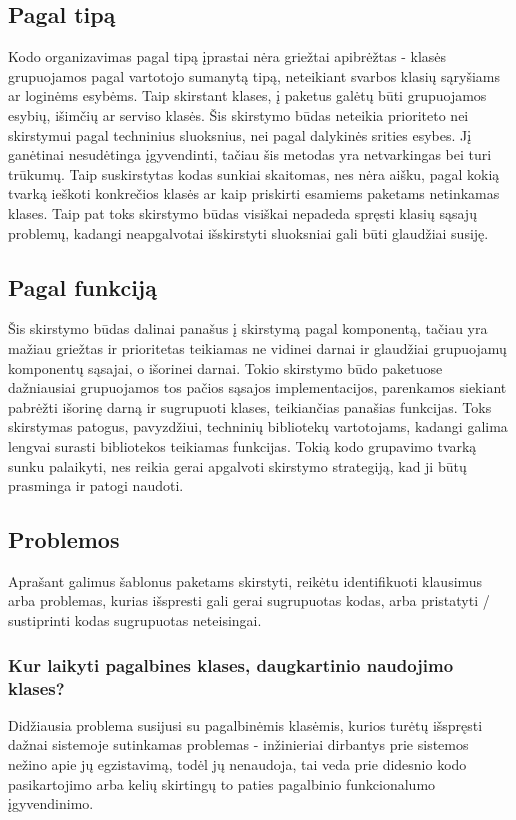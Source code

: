 \subsection{Pagal tipą}
Kodo organizavimas pagal tipą įprastai nėra griežtai apibrėžtas - klasės grupuojamos pagal vartotojo sumanytą tipą, neteikiant svarbos
klasių sąryšiams ar loginėms esybėms. Taip skirstant klases, į paketus galėtų būti grupuojamos esybių, išimčių ar serviso klasės. Šis skirstymo būdas
neteikia prioriteto nei skirstymui pagal techninius sluoksnius, nei pagal dalykinės srities esybes. Jį ganėtinai nesudėtinga įgyvendinti,
tačiau šis metodas yra netvarkingas bei turi trūkumų. Taip suskirstytas kodas sunkiai skaitomas, nes nėra aišku, pagal kokią tvarką
ieškoti konkrečios klasės ar kaip priskirti esamiems paketams netinkamas klases. Taip pat toks skirstymo būdas visiškai nepadeda spręsti
klasių sąsajų problemų, kadangi neapgalvotai išskirstyti sluoksniai gali būti glaudžiai susiję.

\subsection{Pagal funkciją}
Šis skirstymo būdas dalinai panašus į skirstymą pagal komponentą, tačiau yra mažiau griežtas ir
prioritetas teikiamas ne vidinei darnai ir glaudžiai grupuojamų
komponentų sąsajai, o išorinei darnai. Tokio skirstymo būdo paketuose dažniausiai grupuojamos tos pačios sąsajos implementacijos,
parenkamos siekiant pabrėžti išorinę darną ir sugrupuoti klases, teikiančias panašias funkcijas. Toks skirstymas patogus, pavyzdžiui,
techninių bibliotekų vartotojams, kadangi galima lengvai surasti bibliotekos teikiamas funkcijas. Tokią kodo grupavimo tvarką sunku palaikyti,
nes reikia gerai apgalvoti skirstymo strategiją, kad ji būtų prasminga ir patogi naudoti.



\subsection{Problemos}
Aprašant galimus šablonus paketams skirstyti, reikėtu identifikuoti klausimus arba problemas, kurias išspresti gali
gerai sugrupuotas kodas, arba pristatyti / sustiprinti kodas sugrupuotas neteisingai.

\subsubsection{Kur laikyti pagalbines klases, daugkartinio naudojimo klases?}
Didžiausia problema susijusi su pagalbinėmis klasėmis, kurios turėtų išspręsti dažnai sistemoje sutinkamas problemas -
inžinieriai dirbantys prie sistemos nežino apie jų egzistavimą, todėl jų nenaudoja,
tai veda prie didesnio kodo pasikartojimo arba kelių skirtingų to paties pagalbinio funkcionalumo įgyvendinimo.

